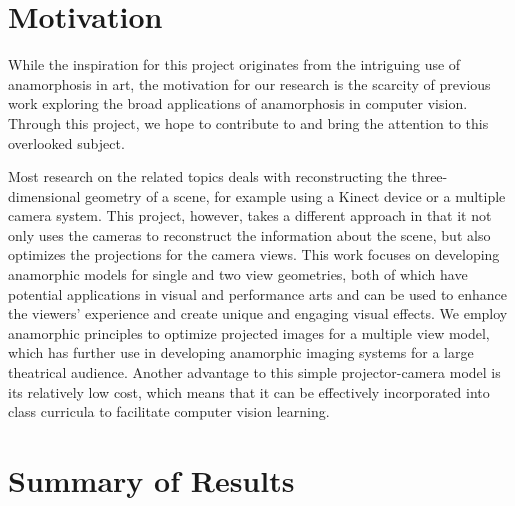 \documentclass[11pt, oneside, reqno]{book}
\begin{document}

\section{Motivation}
\label{sec:motivation}

While the inspiration for this project originates from the intriguing use of anamorphosis in art, the motivation for our research is the scarcity of previous work exploring the broad applications of anamorphosis in computer vision. Through this project, we hope to contribute to and bring the attention to this overlooked subject. 

Most research on the related topics deals with reconstructing the three-dimensional geometry of a scene, for example using a Kinect device or a multiple camera system. This project, however, takes a different approach in that it not only uses the cameras to reconstruct the information about the scene, but also optimizes the projections for the camera views. This work focuses on developing anamorphic models for single and two view geometries, both of which have potential applications in visual and performance arts and can be used to enhance the viewers' experience and create unique and engaging visual effects. We employ anamorphic principles to optimize projected images for a multiple view model, which has further use in developing anamorphic imaging systems for a large theatrical audience. Another advantage to this simple projector-camera model is its relatively low cost, which means that it can be effectively incorporated into class curricula to facilitate computer vision learning. 










\section{Summary of Results}
\label{sec:summary}
\end{document}
